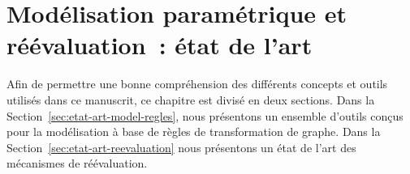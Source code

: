 \chapter[Modélisation paramétrique et réévaluation~: état
  de l'art]{Modélisation paramétrique et réévaluation~: état
  de l'art}
\label{cha:etat-art-reevaluation}

Afin de permettre une bonne compréhension des différents concepts et outils
utilisés dans ce manuscrit, ce chapitre est divisé en deux sections. %
Dans la Section~\ref{sec:etat-art-model-regles}, nous présentons un ensemble
d'outils conçus pour la modélisation à base de règles de transformation de
graphe. %
Dans la Section~\ref{sec:etat-art-reevaluation} nous présentons un état de l'art
des mécanismes de réévaluation.

